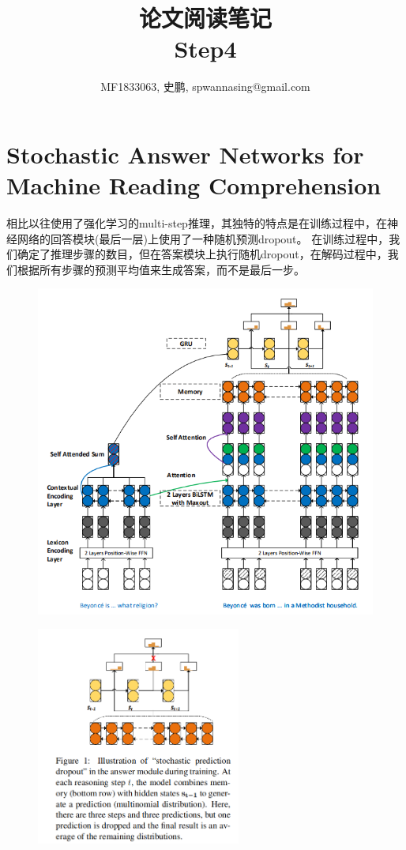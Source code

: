 \documentclass[a4paper,UTF8]{article}
\numberwithin{equation}{section}
\begin{document}
\title{论文阅读笔记\\
Step4}
\author{MF1833063, 史鹏, spwannasing@gmail.com}
\maketitle

\newpage
\section{Stochastic Answer Networks for Machine Reading Comprehension}
相比以往使用了强化学习的multi-step推理，其独特的特点是在训练过程中，在神经网络的回答模块(最后一层)上使用了一种随机预测dropout。
在训练过程中，我们确定了推理步骤的数目，但在答案模块上执行随机dropout，在解码过程中，我们根据所有步骤的预测平均值来生成答案，而不是最后一步。
\begin{figure}[H]
	\centering
	\includegraphics[width=\textwidth]{1-2.png}
\end{figure}
\begin{figure}[H]
	\centering
	\includegraphics[width=0.6\textwidth]{1-1.png}
\end{figure}
\end{document}
